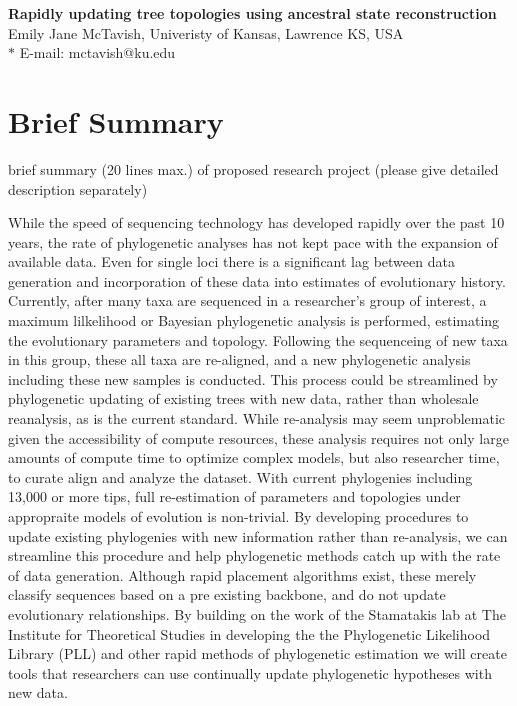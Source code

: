 \documentclass[10pt]{article}
\date{}
\begin{document}
\begin{flushleft}
{\Large
\textbf{Rapidly updating tree topologies using ancestral state reconstruction}
}
\\
Emily Jane McTavish, Univeristy of Kansas, Lawrence KS, USA
\\

$\ast$ E-mail: mctavish@ku.edu
\end{flushleft}

\section*{Brief Summary}

brief summary (20 lines max.) of proposed research project (please give detailed description separately)

While the speed of sequencing technology has developed rapidly over the past 10 years, the rate of phylogenetic analyses has not kept pace with the expansion of available data. Even for single loci there is a significant lag between data generation and incorporation of these data into estimates of evolutionary history. Currently, after many taxa are sequenced in a researcher's group of interest, a  maximum lilkelihood or Bayesian phylogenetic analysis is performed, estimating the evolutionary parameters and topology. Following the sequenceing of new taxa in this group, these all taxa are re-aligned, and a new phylogenetic analysis including these new samples is conducted. This process could be streamlined by phylogenetic updating of existing trees with new data, rather than wholesale reanalysis, as is the current standard. While re-analysis may seem unproblematic given the accessibility of compute resources, these analysis requires not only large amounts of compute time to optimize complex models, but also researcher time, to curate align and analyze the dataset. With current phylogenies including 13,000 \cite{smith_rates_2008} or more tips, full re-estimation of parameters and topologies under appropraite models of evolution is non-trivial.  By developing procedures to update existing phylogenies with new information rather than re-analysis, we can streamline this procedure and help phylogenetic methods catch up with the rate of data generation. Although rapid placement algorithms exist, these merely classify sequences based on a pre existing backbone, and do not update evolutionary relationships. By building on the work of the Stamatakis lab at The Institute for Theoretical Studies in developing the the Phylogenetic Likelihood Library (PLL) and other rapid methods of phylogenetic estimation we will create tools that researchers can use continually update phylogenetic hypotheses with new data.
\end{document}
